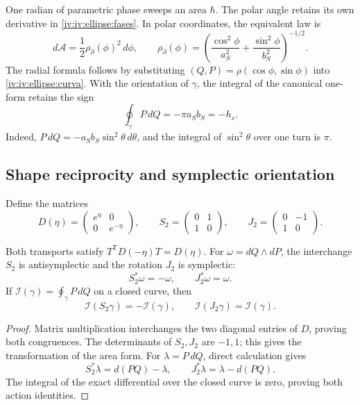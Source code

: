 One radian of parametric phase sweeps an area \(\hbar\). The polar
angle retains its own derivative in
\eqref{iv:iv:ellipse:fases}. In polar coordinates, the equivalent
law is
\[
 d\mathcal A=\frac12\rho_{\partial}(\phi)^2\,d\phi,\qquad
 \rho_{\partial}(\phi)=
 \left(\frac{\cos^2\phi}{a_S^2}
       +\frac{\sin^2\phi}{b_S^2}\right)^{-1/2}.
\]
The radial formula follows by substituting
\((Q,P)=\rho(\cos\phi,\sin\phi)\) into
\eqref{iv:iv:ellipse:curva}. With the orientation of
\(\gamma\), the integral of the canonical one-form retains
the sign
\begin{equation}
 \oint_\gamma P\,dQ=-\pi a_Sb_S=-h_s.
 \label{iv:iv:ellipse:accion-orientada}
\end{equation}
Indeed, \(P\,dQ=-a_Sb_S\sin^2\theta\,d\theta\), and
the integral of \(\sin^2\theta\) over one turn is \(\pi\).

\subsection{Shape reciprocity and symplectic orientation}
\label{iv:iv:ellipse:reciprocidad}

Define the matrices
\begin{equation}
 D(\eta)=\begin{pmatrix}e^\eta&0\\0&e^{-\eta}\end{pmatrix},
 \qquad
 S_2=\begin{pmatrix}0&1\\1&0\end{pmatrix},
 \qquad
 J_2=\begin{pmatrix}0&-1\\1&0\end{pmatrix}.
 \label{iv:iv:ellipse:transportes}
\end{equation}

\begin{proposition}
\label{iv:iv:ellipse:accion-reciproca}
Both transports satisfy
\(T^{\mathsf T}D(-\eta)T=D(\eta)\).
For \(\omega=dQ\wedge dP\), the interchange \(S_2\) is
antisymplectic and the rotation \(J_2\) is symplectic:
\[
 S_2^*\omega=-\omega,\qquad J_2^*\omega=\omega.
\]
If \(\mathcal I(\gamma)=\oint_\gamma P\,dQ\) on a
closed curve, then
\begin{equation}
 \mathcal I(S_2\gamma)=-\mathcal I(\gamma),\qquad
 \mathcal I(J_2\gamma)=\mathcal I(\gamma).
 \label{iv:iv:ellipse:signos-accion}
\end{equation}
\end{proposition}
\begin{proof}
Matrix multiplication interchanges the two diagonal entries
of \(D\), proving both congruences.
The determinants of \(S_2,J_2\) are \(-1,1\);
this gives the transformation of the area form.
For \(\lambda=P\,dQ\), direct calculation gives
\[
 S_2^*\lambda=d(PQ)-\lambda,\qquad
 J_2^*\lambda=\lambda-d(PQ).
\]
The integral of the exact differential over the closed curve
is zero, proving both action identities.
\end{proof}

